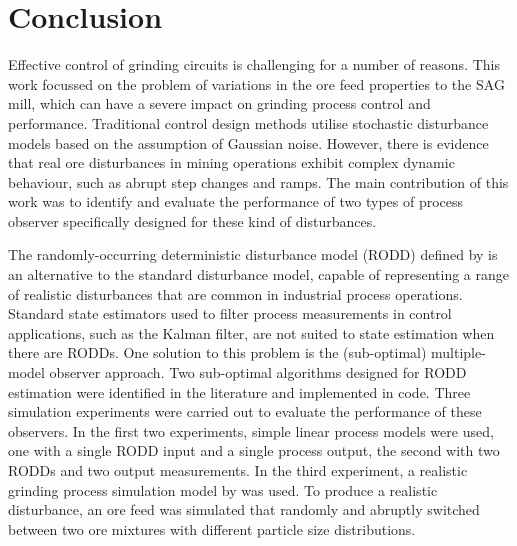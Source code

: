 \chapter*{Conclusion}           %
\label{chap-conclusion}         %

Effective control of grinding circuits is challenging for a number of reasons. This work focussed on the problem of variations in the ore feed properties to the \gls{SAG} mill, which can have a severe impact on grinding process control and performance. Traditional control design methods utilise stochastic disturbance models based on the assumption of Gaussian noise. However, there is evidence that real ore disturbances in mining operations exhibit complex dynamic behaviour, such as abrupt step changes and ramps. The main contribution of this work was to identify and evaluate the performance of two types of process observer specifically designed for these kind of disturbances.

The randomly-occurring deterministic disturbance model (\gls{RODD}) defined by \cite{macgregor_duality_1984} is an alternative to the standard disturbance model, capable of representing a range of realistic disturbances that are common in industrial process operations. Standard state estimators used to filter process measurements in control applications, such as the Kalman filter, are not suited to state estimation when there are \gls{RODD}s. One solution to this problem is the (sub-optimal) multiple-model observer approach. Two sub-optimal algorithms designed for \gls{RODD} estimation were identified in the literature and implemented in code. Three simulation experiments were carried out to evaluate the performance of these observers. In the first two experiments, simple linear process models were used, one with a single RODD input and a single process output, the second with two \gls{RODD}s and two output measurements. In the third experiment, a realistic grinding process simulation model by \cite{perez_garcia_dynamic_2020} was used. To produce a realistic disturbance, an ore feed was simulated that randomly and abruptly switched between two ore mixtures with different particle size distributions.


